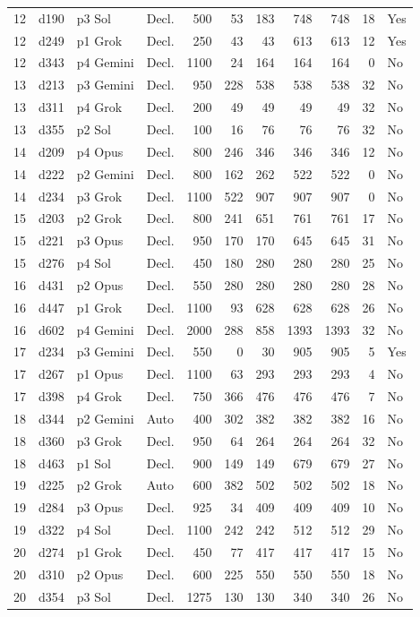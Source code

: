 \begin{longtable}{r l l l r r r r r r l}
12 & d190 & p3 Sol & Decl. & 500 & 53 & 183 & 748 & 748 & 18 & Yes \\
12 & d249 & p1 Grok & Decl. & 250 & 43 & 43 & 613 & 613 & 12 & Yes \\
12 & d343 & p4 Gemini & Decl. & 1100 & 24 & 164 & 164 & 164 & 0 & No \\
13 & d213 & p3 Gemini & Decl. & 950 & 228 & 538 & 538 & 538 & 32 & No \\
13 & d311 & p4 Grok & Decl. & 200 & 49 & 49 & 49 & 49 & 32 & No \\
13 & d355 & p2 Sol & Decl. & 100 & 16 & 76 & 76 & 76 & 32 & No \\
14 & d209 & p4 Opus & Decl. & 800 & 246 & 346 & 346 & 346 & 12 & No \\
14 & d222 & p2 Gemini & Decl. & 800 & 162 & 262 & 522 & 522 & 0 & No \\
14 & d234 & p3 Grok & Decl. & 1100 & 522 & 907 & 907 & 907 & 0 & No \\
15 & d203 & p2 Grok & Decl. & 800 & 241 & 651 & 761 & 761 & 17 & No \\
15 & d221 & p3 Opus & Decl. & 950 & 170 & 170 & 645 & 645 & 31 & No \\
15 & d276 & p4 Sol & Decl. & 450 & 180 & 280 & 280 & 280 & 25 & No \\
16 & d431 & p2 Opus & Decl. & 550 & 280 & 280 & 280 & 280 & 28 & No \\
16 & d447 & p1 Grok & Decl. & 1100 & 93 & 628 & 628 & 628 & 26 & No \\
16 & d602 & p4 Gemini & Decl. & 2000 & 288 & 858 & 1393 & 1393 & 32 & No \\
17 & d234 & p3 Gemini & Decl. & 550 & 0 & 30 & 905 & 905 & 5 & Yes \\
17 & d267 & p1 Opus & Decl. & 1100 & 63 & 293 & 293 & 293 & 4 & No \\
17 & d398 & p4 Grok & Decl. & 750 & 366 & 476 & 476 & 476 & 7 & No \\
18 & d344 & p2 Gemini & Auto & 400 & 302 & 382 & 382 & 382 & 16 & No \\
18 & d360 & p3 Grok & Decl. & 950 & 64 & 264 & 264 & 264 & 32 & No \\
18 & d463 & p1 Sol & Decl. & 900 & 149 & 149 & 679 & 679 & 27 & No \\
19 & d225 & p2 Grok & Auto & 600 & 382 & 502 & 502 & 502 & 18 & No \\
19 & d284 & p3 Opus & Decl. & 925 & 34 & 409 & 409 & 409 & 10 & No \\
19 & d322 & p4 Sol & Decl. & 1100 & 242 & 242 & 512 & 512 & 29 & No \\
20 & d274 & p1 Grok & Decl. & 450 & 77 & 417 & 417 & 417 & 15 & No \\
20 & d310 & p2 Opus & Decl. & 600 & 225 & 550 & 550 & 550 & 18 & No \\
20 & d354 & p3 Sol & Decl. & 1275 & 130 & 130 & 340 & 340 & 26 & No \\
\end{longtable}
